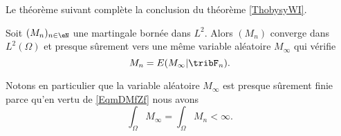 Le théorème suivant complète la conclusion du théorème \ref{ThobysyWI}.
\begin{theorem} \label{ThofcttYW}
    Soit \( (M_n)_{n\in \eN}\) une martingale bornée dans \( L^2\). Alors \( (M_n)\) converge dans \( L^2(\Omega)\) et presque sûrement vers une même variable aléatoire \( M_{\infty}\) qui vérifie
    \begin{equation}        \label{EqmDMfZf}
        M_n=E(M_{\infty}|\tribF_n).
    \end{equation}
\end{theorem}

Notons en particulier que la variable aléatoire \( M_{\infty}\) est presque sûrement finie parce qu'en vertu de \eqref{EqmDMfZf} nous avons
\begin{equation}
    \int_{\Omega}M_{\infty}=\int_{\Omega}M_n<\infty.
\end{equation}

